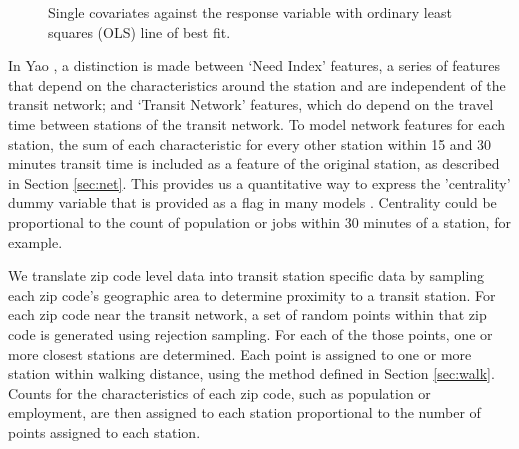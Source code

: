 \documentclass[11pt]{article}
\begin{document}
\begin{figure}[H]
\centering
{}
\caption{Single covariates against the response variable with ordinary least squares (OLS) line of best fit.}\label{fig:chartypes}
\end{figure}


In Yao \cite{Yao2007}, a distinction is made between `Need Index' features, a series of features that depend on the characteristics around the station and are independent of the transit network; and `Transit Network' features, which do depend on the travel time between stations of the transit network. To model network features for each station, the sum of each characteristic for every other station within 15 and 30 minutes transit time is included as a feature of the original station, as described in Section \ref{sec:net}. This provides us a quantitative way to express the 'centrality' dummy variable that is provided as a flag in many models \cite{Kuby2004, Durning2015}. Centrality could be proportional to the count of population or jobs within 30 minutes of a station, for example. 

We translate zip code level data into transit station specific data by sampling each zip code's geographic area to determine proximity to a transit station. For each zip code near the transit network, a set of random points within that zip code is generated using rejection sampling. For each of the those points, one or more closest stations are determined. Each point is assigned to one or more station within walking distance, using the method defined in Section \ref{sec:walk}. Counts for the characteristics of each zip code, such as population or employment, are then assigned to each station proportional to the number of points assigned to each station.
\end{document}

